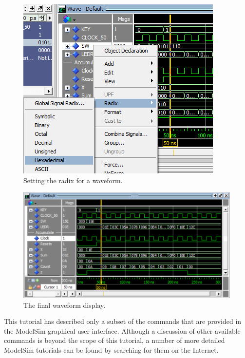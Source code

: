 \documentclass[11pt, twoside, pdftex]{article}
\newcommand{\commonPath}{../../../Common}
\begin{document}
\begin{figure}[h!]
	\begin{center}
		\includegraphics[scale=1.25]{figures/appa_fig12.png}
	\end{center}
		  \caption{Setting the radix for a waveform.}
	\label{fig:appa_fig12}
\end{figure}

\begin{figure}[h!]
	\begin{center}
		\includegraphics[scale=0.8]{figures/appa_fig13.png}
	\end{center}
		  \caption{The final waveform display.}
	\label{fig:appa_fig13}
\end{figure}

\noindent
This tutorial has described only a subset of the commands that are provided in the
ModelSim graphical user interface. Although a discussion of other available commands is 
beyond the scope of this tutorial, a number of more detailed ModelSim tutorials can be 
found by searching for them on the Internet.



\end{document}
